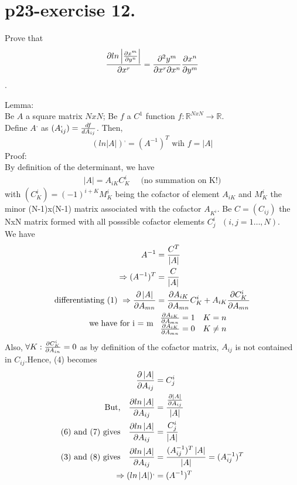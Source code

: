 \section{p23-exercise 12.}
\begin{tcolorbox}
Prove that $$\pdv{ln\left|\pdv{x^m}{y^n}\right|}{x^r} =\pdv{y^m}{x^r}{x^n}\pdv{x^n}{y^m}$$.
\end{tcolorbox}
Lemma:\\
Be $A$ a square matrix $NxN$; Be $f$ a $C^1$ function $f:\mathbb{R}^{NxN} \rightarrow \mathbb{R}$. \\Define $A^{,}$ as $(A^,_{ij}) = \dv{f}{A_{ij}}$. Then,$$(ln\left|A\right|)^, = (A^{-1})^T \text{ wih }  f =\left|A\right|$$
Proof:\\
By definition of the determinant, we have
\begin{align}
\left|A\right| = A_{iK}C_{K}^i \quad \text{ (no summation on K!)}
\end{align}
with $(C_{K}^i) =  (-1)^{i+K}M^{i}_K$ being the cofactor  of element $A_{iK}$ and $M^{i}_K$ the minor (N-1)x(N-1) matrix associated with the cofactor $A_{K^i}$. Be $C = (C_{ij})$ the NxN matrix formed with all posssible cofactor elements  $C_{j}^i \text{  }(i,j = 1 \dots,N)$.\\
We have 
\begin{align}
\ A^{-1} &= \frac{C^T}{\left|A\right|}\\
\Rightarrow (A^{-1})^T &= \frac{C}{\left|A\right|} \\
\text{differentiating (1) }\Rightarrow \pdv{\left|A\right|}{A_{mn}} &= \pdv{A_{iK}}{A_{mn}}C^i_K +A_{iK} \pdv{C^i_K}{A_{mn}}\\
\text{we have for i = m } & \begin{array}{c}
    \pdv{A_{iK}}{A_{mn}} = 1\quad K=n\\
    \pdv{A_{iK}}{A_{mn}} = 0\quad K \neq n\\
  \end{array}
\end{align}
Also, $\forall K: \pdv{C^i_K}{A_{in}} = 0 $ as by definition of the cofactor matrix, $A_{ij} $ is not contained in $C_{ij} $.Hence, (4) becomes
\begin{align}
\pdv{\left|A\right|}{A_{ij}} &= C^i_j\\
\text{But,}\quad \pdv{ln\left|A\right|}{A_{ij}} &= \frac{\pdv{\left|A\right|}{A_{ij}}}{\left|A\right|}\\
\text{(6) and  (7) gives}\quad \pdv{ln\left|A\right|}{A_{ij}} &= \frac{C^i_j}{\left|A\right|}\\
\text{(3) and  (8) gives}\quad \pdv{ln\left|A\right|}{A_{ij}} &= \frac{(A^{-1}_{ij})^T \left|A\right|}{\left|A\right|} = (A^{-1}_{ij})^T \\
\Rightarrow (ln\left|A\right|)^, &= (A^{-1})^T
\end{align}\\\\
